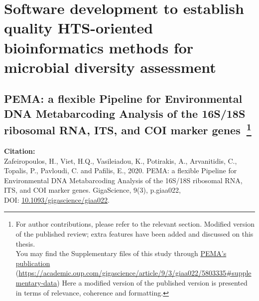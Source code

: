 % 
% 

\chapter{Software development to establish quality HTS-oriented bioinformatics methods for microbial diversity assessment}
\label{cha:2}


% 
% 
\section[PEMA: a flexible Pipeline for Environmental DNA Metabarcoding Analysis of the 16S/18S ribosomal RNA, ITS, and COI marker genes]{
   PEMA: a flexible Pipeline for Environmental DNA Metabarcoding Analysis of the 16S/18S ribosomal RNA, ITS, and COI marker genes~\footnote{
      For author contributions, please refer to the relevant section. Modified version of the published review; extra features have been added and discussed on this thesis.\\
      You may find the Supplementary files of this study through 
      \href{https://academic.oup.com/gigascience/article/9/3/giaa022/5803335\#supplementary-data}{PEMA's publication}
      (\href{https://academic.oup.com/gigascience/article/9/3/giaa022/5803335\#supplementary-data}{https://academic.oup.com/gigascience/article/9/3/giaa022/5803335\#supplementary-data})
      Here a modified version of the published version is presented in terms of relevance, coherence and formatting.
   }
}
\label{publ:pema}

   \textbf{Citation:} \\ 
   Zafeiropoulos, H., Viet, H.Q., Vasileiadou, K., Potirakis, A., Arvanitidis, C., Topalis, P., Pavloudi, C. and Pafilis, E., 2020. PEMA: a flexible Pipeline for Environmental DNA Metabarcoding Analysis of the 16S/18S ribosomal RNA, ITS, and COI marker genes. GigaScience, 9(3), p.giaa022, \\ 
   DOI: \href{https://doi.org/10.1093/gigascience/giaa022}{10.1093/gigascience/giaa022}.


